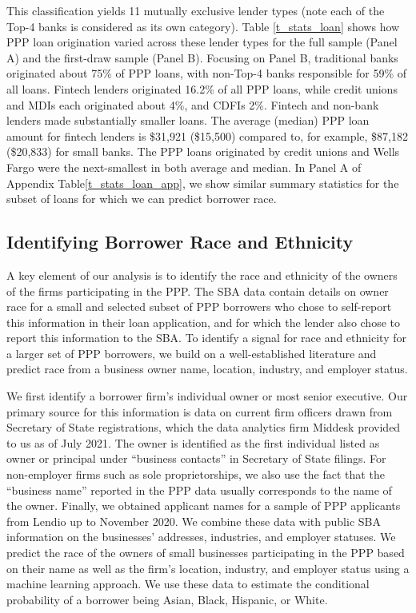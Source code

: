 \documentclass[11pt]{article}
\begin{document}
This classification yields 11 mutually exclusive lender types (note each of the Top-4 banks is considered as its own category). Table \ref{t_stats_loan} shows how PPP loan origination varied across these lender types for the full sample (Panel A) and the first-draw sample (Panel B). Focusing on Panel B, traditional banks originated about 75\% of PPP loans, with non-Top-4 banks responsible for 59\% of all loans. Fintech lenders originated 16.2\% of all PPP loans, while credit unions and MDIs each originated about 4\%, and CDFIs 2\%. Fintech and non-bank lenders made substantially smaller loans. The average (median) PPP loan amount for fintech lenders is \$31,921 (\$15,500) compared to, for example, \$87,182 (\$20,833) for small banks. The PPP loans originated by credit unions and Wells Fargo were the next-smallest in both average and median. In Panel A of Appendix Table\ref{t_stats_loan_app}, we show similar summary statistics for the subset of loans for which we can predict borrower race.

\subsection{Identifying Borrower Race and Ethnicity}\label{race_predict}

A key element of our analysis is to identify the race and ethnicity of the owners of the firms participating in the PPP. The SBA data contain details on owner race for a small and selected subset of PPP borrowers who chose to self-report this information in their loan application, and for which the lender also chose to report this information to the SBA. To identify a signal for race and ethnicity for a larger set of PPP borrowers, we build on a well-established literature and predict race from a business owner name, location, industry, and employer status. 

We first identify a borrower firm's individual owner or most senior executive. Our primary source for this information is data on current firm officers drawn from Secretary of State registrations, which the data analytics firm Middesk provided to us as of July 2021. The owner is identified as the first individual listed as owner or principal under “business contacts” in Secretary of State filings. For non-employer firms such as sole proprietorships, we also use the fact that the ``business name'' reported in the PPP data usually corresponds to the name of the owner. Finally, we obtained applicant names for a sample of PPP applicants from Lendio up to November 2020. We combine these data with public SBA information on the businesses' addresses, industries, and employer statuses. We predict the race of the owners of small businesses participating in the PPP based on their name as well as the firm's location, industry, and employer status using a machine learning approach. We use these data to estimate the conditional probability of a borrower being Asian, Black, Hispanic, or White. 
\end{document}
